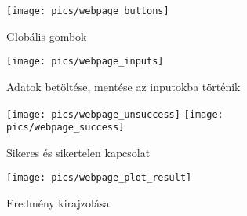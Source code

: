 	\begin{figure}[h]
		\texttt{[image: pics/webpage\_buttons]}
		\centering
		\caption{Globális gombok\label{fig:webpage_buttons}}
	\end{figure}

	\begin{figure}[h]
		\texttt{[image: pics/webpage\_inputs]}
		\centering
		\caption{Adatok betöltése, mentése az inputokba történik \label{fig:webpage_inputs}}
	\end{figure}

	\begin{figure}[h]
		\texttt{[image: pics/webpage\_unsuccess]}
		\texttt{[image: pics/webpage\_success]}
		\centering
		\caption{Sikeres és sikertelen kapcsolat\label{fig:webpage_unsuccess}}
	\end{figure}

	\begin{figure}[h]
		\texttt{[image: pics/webpage\_plot\_result]}
		\centering
		\caption{Eredmény kirajzolása\label{fig:webpage_plot_result}}
	\end{figure}

